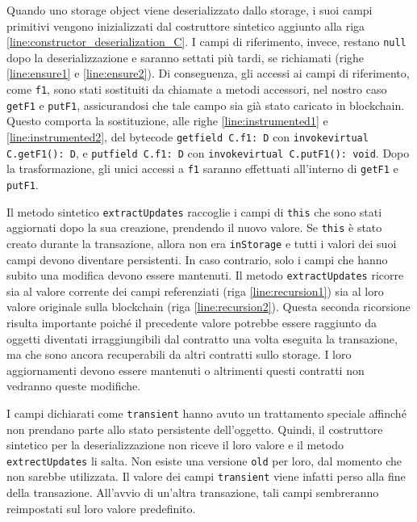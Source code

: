 %
Quando uno storage object viene deserializzato dallo storage, i suoi campi primitivi vengono inizializzati dal costruttore sintetico aggiunto alla riga \ref{line:constructor_deserialization_C}. I campi di riferimento, invece, restano \lstinline|null| dopo la deserializzazione e saranno settati più tardi, se richiamati (righe \ref{line:ensure1} e \ref{line:ensure2}). Di conseguenza, gli accessi ai campi di riferimento, come \lstinline|f1|, sono stati sostituiti da chiamate a metodi accessori, nel nostro caso \lstinline|getF1| e \lstinline|putF1|, assicurandosi che tale campo sia già stato caricato in blockchain. Questo comporta la sostituzione, alle righe \ref{line:instrumented1} e \ref{line:instrumented2}, del bytecode \lstinline|getfield C.f1: D| con \lstinline|invokevirtual C.getF1(): D|, e \lstinline|putfield C.f1: D| con \lstinline|invokevirtual C.putF1(): void|. Dopo la trasformazione, gli unici accessi a \lstinline|f1| saranno effettuati all'interno di \lstinline|getF1| e \lstinline|putF1|. 

Il metodo sintetico \lstinline|extractUpdates| raccoglie i campi di \lstinline|this| che sono stati aggiornati dopo la sua creazione, prendendo il nuovo valore. Se \lstinline|this| è stato creato durante la transazione, allora non era \lstinline|inStorage| e tutti i valori dei suoi campi devono diventare persistenti. In caso contrario, solo i campi che hanno subito una modifica devono essere mantenuti. Il metodo \lstinline|extractUpdates| ricorre sia al valore corrente dei campi referenziati (riga \ref{line:recursion1}) sia al loro valore originale sulla blockchain (riga \ref{line:recursion2}). Questa seconda ricorsione risulta importante poiché il precedente valore potrebbe essere raggiunto da oggetti diventati irraggiungibili dal contratto una volta eseguita la transazione, ma che sono ancora recuperabili da altri contratti sullo storage. I loro aggiornamenti devono essere mantenuti o altrimenti questi contratti non vedranno queste modifiche.

I campi dichiarati come \lstinline|transient| hanno avuto un trattamento speciale affinché non prendano parte allo stato persistente dell'oggetto. Quindi, il costruttore sintetico per la deserializzazione non riceve il loro valore e il metodo \lstinline|extrectUpdates| li salta. Non esiste una versione \lstinline|old| per loro, dal momento che non sarebbe utilizzata. Il valore dei campi \lstinline|transient| viene infatti perso alla fine della transazione. All'avvio di un'altra transazione, tali campi sembreranno reimpostati sul loro valore predefinito.

